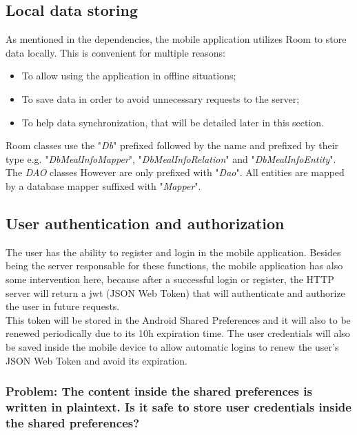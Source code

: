 \subsection{Local data storing}

As mentioned in the dependencies, the mobile application utilizes Room to store data locally. This is convenient
for multiple reasons: 
\begin{itemize}
    \item To allow using the application in offline situations;
    \item To save data in order to avoid unnecessary requests to the server;
    \item To help data synchronization, that will be detailed later in this section.
\end{itemize}

Room classes use the "\textit{Db}" prefixed followed by the name and prefixed by their type e.g. "\textit{DbMealInfoMapper}", "\textit{DbMealInfoRelation}" and "\textit{DbMealInfoEntity}". 
The \textit{DAO} classes However are only prefixed with "\textit{Dao}". 
All entities are mapped by a database mapper suffixed with "\textit{Mapper}".

\subsection{User authentication and authorization}

The user has the ability to register and login in the mobile application. Besides being the server responsable for these functions, the mobile application has also some intervention
here, because after a successful login or register, the HTTP server will return a jwt (JSON Web Token) that will authenticate and authorize the user in future requests.\\

This token will be stored in the Android Shared Preferences\cite{sharedpreferences} and it will also to be renewed periodically due to its 10h expiration time. The user credentials will also be saved
inside the mobile device to allow automatic logins to renew the user's JSON Web Token and avoid its expiration.\\

\subsubsection{Problem: The content inside the shared preferences is written in plaintext. Is it safe to store user credentials inside the shared preferences?}


